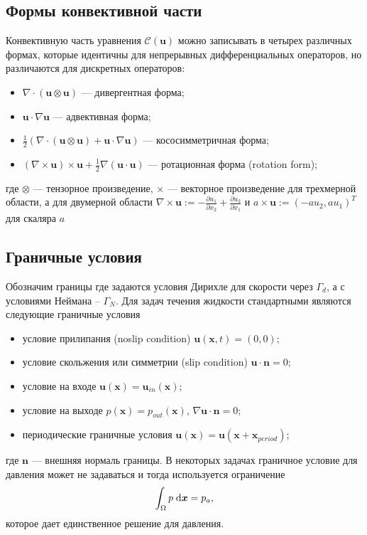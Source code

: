 \documentclass[a4paper,10pt]{report}
\begin{document}
\subsection{Формы конвективной части}

Конвективную часть уравнения $\mathcal{C}(\bm{u})$ можно записывать в четырех различных формах, которые идентичны для непрерывных дифференциальных операторов, но различаются для дискретных операторов:
\begin{itemize}
\item $\nabla \cdot \left(\bm{u} \otimes \bm{u} \right)$ --- дивергентная форма;
\item $\bm{u} \cdot \nabla \bm{u}$ --- адвективная форма;
\item $\frac{1}{2}\left(\nabla \cdot \left(\bm{u} \otimes \bm{u} \right) + \bm{u} \cdot \nabla \bm{u} \right)$ --- кососимметричная форма;
\item $\left( \nabla \times \bm{u} \right) \times \bm{u} + \frac{1}{2} \nabla \left(\bm{u} \cdot \bm{u} \right) $ --- ротационная форма (rotation form);
\end{itemize}
где $\otimes$ --- тензорное произведение, $\times$ --- векторное произведение для трехмерной области, а для двумерной области $\nabla \times \bm{u} := -\frac{\partial u_1}{\partial x_2} + \frac{\partial u_2}{\partial x_1}$ и $a \times \bm{u} := (-a u_2, a u_1)^T$ для скаляра $a$


\subsection{Граничные условия}
Обозначим границы где задаются условия Дирихле для скорости через $\Gamma_d$, а с условиями Неймана -- $\Gamma_N$. Для задач течения жидкости стандартными являются следующие граничные условия
\begin{itemize}
\item условие прилипания (noslip condition) $\bm{u}(\bm{x}, t) = (0, 0)$;
\item условие скольжения или симметрии (slip condition) $\bm{u} \cdot \bm{n} = 0$;
\item условие на входе $\bm{u}(\bm{x}) = \bm{u}_{in}(\bm{x})$;
\item условие на выходе $p(\bm{x}) = p_{out}(\bm{x})$, $\nabla \bm{u} \cdot \bm{n} = 0$;
\item периодические граничные условия $\bm{u}(\bm{x}) = \bm{u}(\bm{x} + \bm{x}_{period})$;
\end{itemize}
где $\bm{n}$ --- внешняя нормаль границы. В некоторых задачах граничное условие для давления может не задаваться и тогда используется ограничение 
\begin{equation}
\int_\Omega p \; {\rm d}\bm{x} = p_{a},
\label{eq:constrain}
\end{equation}
которое дает единственное решение для давления.
\end{document}
